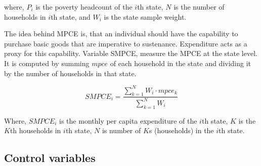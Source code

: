 \documentclass [12pt]{article}
\begin{document}
\vspace{0.4cm}

\noindent where, \(P_i\) is the poverty headcount of the \(i\)th state, \(N\) is the number of households in \(i\)th state, and $W_i$ is the state sample weight.
\vspace{0.3cm}

\newpage
{}

\par \vspace{0.3cm}
\text  The idea behind MPCE is, that an individual should have the capability to purchase basic goods that are imperative to sustenance. Expenditure acts as a proxy for this capability.  Variable  SMPCE, measure the MPCE at the state level. It is computed by summing \(mpce\) of each household in the state and dividing it by the number of households in that state.

\begin{equation} \nonumber
    SMPCE_i = \frac{\sum_{k=1}^{N} W_i \cdot mpce_{k}}{\sum_{k=1}^{N} W_i}
\end{equation}

\noindent Where, \(SMPCE_{i}\) is the monthly per capita expenditure of the \(i\)th state, \(K\) is the \(K\)th households in \(i\)th state, \(N\) is number of \(K\)s (households) in the \(i\)th state.

\subsection{Control variables}
\end{document}

